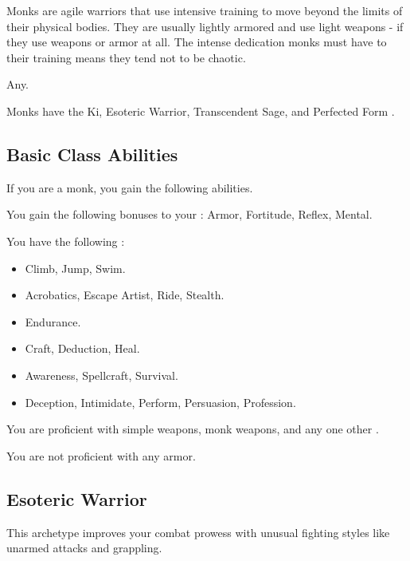     Monks are agile warriors that use intensive training to move beyond the limits of their physical bodies.
    They are usually lightly armored and use light weapons - if they use weapons or armor at all.
    The intense dedication monks must have to their training means they tend not to be chaotic.

     Any.

     Monks have the Ki, Esoteric Warrior, Transcendent Sage, and Perfected Form .

    \subsection{Basic Class Abilities}
        If you are a monk, you gain the following abilities.

        You gain the following bonuses to your :  Armor,  Fortitude,  Reflex,  Mental.

        You have the following :
        \begin{itemize}
            \item {} Climb, Jump, Swim.
            \item {} Acrobatics, Escape Artist, Ride, Stealth.
            \item {} Endurance.
            \item {} Craft, Deduction, Heal.
            \item {} Awareness, Spellcraft, Survival.
            \item {} Deception, Intimidate, Perform, Persuasion, Profession.
        \end{itemize}

        You are proficient with simple weapons, monk weapons, and any one other .

        You are not proficient with any armor.

    \subsection{Esoteric Warrior}\label{Esoteric Warrior}
        This archetype improves your combat prowess with unusual fighting styles like unarmed attacks and grappling.

